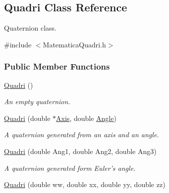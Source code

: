 \hypertarget{classQuadri}{\subsection{\-Quadri \-Class \-Reference}
\label{classQuadri}
}


\-Quaternion class.  




{\ttfamily \#include $<$\-Matematica\-Quadri.\-h$>$}

\subsubsection*{\-Public \-Member \-Functions}
\begin{DoxyCompactItemize}
\item 
\hypertarget{classQuadri_a1051e0443d05a67496c2d8a5a8744712}{\hyperlink{classQuadri_a1051e0443d05a67496c2d8a5a8744712}{\-Quadri} ()}\label{classQuadri_a1051e0443d05a67496c2d8a5a8744712}

\begin{DoxyCompactList}\small\item\em \-An empty quaternion. \end{DoxyCompactList}\item 
\hypertarget{classQuadri_a5ea507ca84d37e0d674d19fc969ffaf2}{\hyperlink{classQuadri_a5ea507ca84d37e0d674d19fc969ffaf2}{\-Quadri} (double $\ast$\hyperlink{classQuadri_ae46739cce135a25e59e90f29fa990d7a}{\-Axis}, double \hyperlink{classQuadri_a5873189e35681f049ce11fe5e220661d}{\-Angle})}\label{classQuadri_a5ea507ca84d37e0d674d19fc969ffaf2}

\begin{DoxyCompactList}\small\item\em \-A quaternion generated from an axis and an angle. \end{DoxyCompactList}\item 
\hypertarget{classQuadri_aa8242ff0da98f01f31c7a3afd7e5deb2}{\hyperlink{classQuadri_aa8242ff0da98f01f31c7a3afd7e5deb2}{\-Quadri} (double \-Ang1, double \-Ang2, double \-Ang3)}\label{classQuadri_aa8242ff0da98f01f31c7a3afd7e5deb2}

\begin{DoxyCompactList}\small\item\em \-A quaternion generated form \-Euler's angle. \end{DoxyCompactList}\item 
\hypertarget{classQuadri_a99dde187c9bd1e5983cf797d5cf55d4b}{\hyperlink{classQuadri_a99dde187c9bd1e5983cf797d5cf55d4b}{\-Quadri} (double ww, double xx, double yy, double zz)}\label{classQuadri_a99dde187c9bd1e5983cf797d5cf55d4b}


\end{DoxyCompactItemize}
